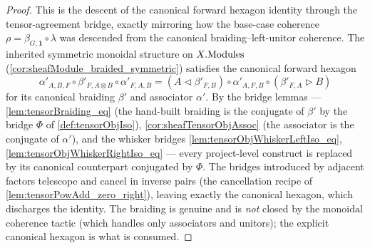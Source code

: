 \begin{proof}
  \leanok
  This is the descent of the canonical forward hexagon identity
  through the tensor-agreement bridge, exactly mirroring how the
  base-case coherence \(\rho = \beta_{G,\mathbf{1}}\circ\lambda\) was descended
  from the canonical braiding--left-unitor coherence. The inherited symmetric
  monoidal structure on \(X.\mathrm{Modules}\) (\cref{cor:sheafModule_braided_symmetric})
  satisfies the canonical forward hexagon
  \[
    \alpha'_{A,B,F}\circ\beta'_{F,A\otimes B}\circ\alpha'_{F,A,B}
    = (A\lhd\beta'_{F,B})\circ\alpha'_{A,F,B}\circ(\beta'_{F,A}\rhd B)
  \]
  for its canonical braiding \(\beta'\) and associator \(\alpha'\). By the bridge
  lemmas --- \cref{lem:tensorBraiding_eq} (the hand-built braiding is the
  conjugate of \(\beta'\) by the bridge \(\Phi\) of \cref{def:tensorObjIso}),
  \cref{cor:sheafTensorObjAssoc} (the associator is the conjugate of \(\alpha'\)),
  and the whisker bridges \cref{lem:tensorObjWhiskerLeftIso_eq},
  \cref{lem:tensorObjWhiskerRightIso_eq} --- every project-level construct is
  replaced by its canonical counterpart conjugated by \(\Phi\). The bridges
  introduced by adjacent factors telescope and cancel in inverse pairs (the
  cancellation recipe of \cref{lem:tensorPowAdd_zero_right}), leaving exactly the
  canonical hexagon, which discharges the identity. The braiding is genuine and is
  \emph{not} closed by the \(\mathrm{monoidal}\) coherence tactic (which handles
  only associators and unitors); the explicit canonical hexagon is what is
  consumed.
\end{proof}

